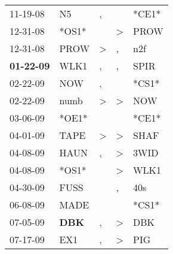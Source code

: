 \begin{supertabular}{p{0.07\textwidth}p{0.06\textwidth}p{0.02\textwidth}p{0.02\textwidth}p{0.06\textwidth}}
          11-19-08\textsuperscript{} &             N5\textsuperscript{} &                , &                  &                            *CE1* \\
          12-31-08\textsuperscript{} &                            *OS1* &                  &     \textgreater &           PROW\textsuperscript{} \\
          12-31-08\textsuperscript{} &           PROW\textsuperscript{} &     \textgreater &                , &            n2f\textsuperscript{} \\
 \textbf{01-22-09\textsuperscript{}} &           WLK1\textsuperscript{} &                , &                , &           SPIR\textsuperscript{} \\
          02-22-09\textsuperscript{} &            NOW\textsuperscript{} &                , &                  &                            *CS1* \\
          02-22-09\textsuperscript{} &           numb\textsuperscript{} &     \textgreater &     \textgreater &            NOW\textsuperscript{} \\
          03-06-09\textsuperscript{} &                            *OE1* &                  &                  &                            *CE1* \\
          04-01-09\textsuperscript{} &           TAPE\textsuperscript{} &     \textgreater &     \textgreater &           SHAF\textsuperscript{} \\
          04-08-09\textsuperscript{} &           HAUN\textsuperscript{} &                , &     \textgreater &           3WID\textsuperscript{} \\
          04-08-09\textsuperscript{} &                            *OS1* &                  &     \textgreater &           WLK1\textsuperscript{} \\
          04-30-09\textsuperscript{} &           FUSS\textsuperscript{} &                  &                , &            40s\textsuperscript{} \\
          06-08-09\textsuperscript{} &           MADE\textsuperscript{} &                  &                  &                            *CS1* \\
          07-05-09\textsuperscript{} &   \textbf{DBK\textsuperscript{}} &                , &     \textgreater &            DBK\textsuperscript{} \\
          07-17-09\textsuperscript{} &            EX1\textsuperscript{} &                , &     \textgreater &            PIG\textsuperscript{} \\

\end{supertabular}
